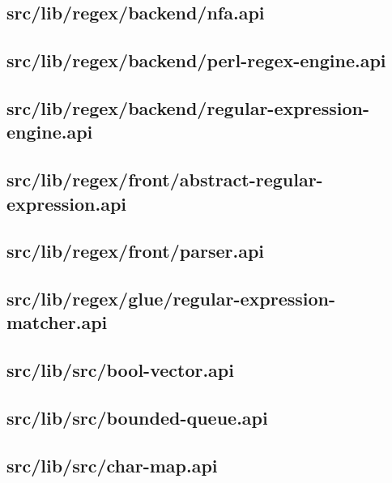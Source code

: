 \subsection{src/lib/regex/backend/nfa.api}


\subsection{src/lib/regex/backend/perl-regex-engine.api}


\subsection{src/lib/regex/backend/regular-expression-engine.api}


\subsection{src/lib/regex/front/abstract-regular-expression.api}


\subsection{src/lib/regex/front/parser.api}


\subsection{src/lib/regex/glue/regular-expression-matcher.api}


\subsection{src/lib/src/bool-vector.api}


\subsection{src/lib/src/bounded-queue.api}


\subsection{src/lib/src/char-map.api}


